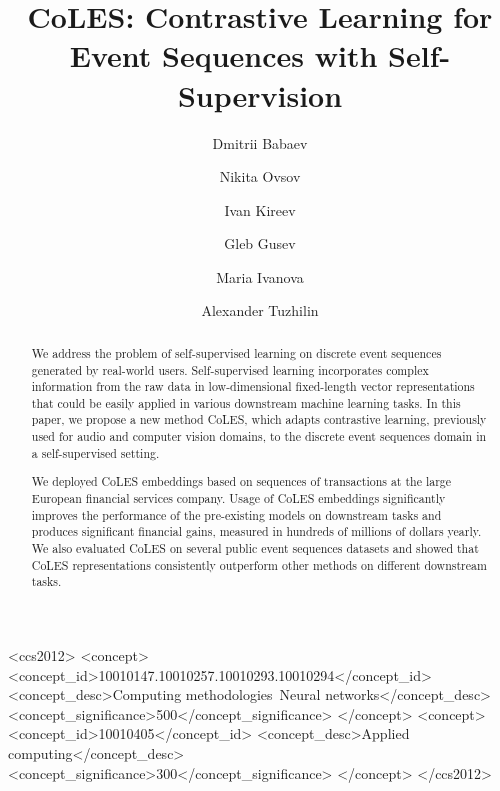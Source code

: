 \documentclass[sigconf]{acmart}
\begin{document}
\title{CoLES: Contrastive Learning for Event Sequences with Self-Supervision}

\author{Dmitrii Babaev} 


\author{Nikita Ovsov} 

\author{Ivan Kireev} 

\author{Gleb Gusev}

\author{Maria Ivanova}

\author{Alexander Tuzhilin}

\begin{abstract}
We address the problem of self-supervised learning on discrete event sequences generated by real-world users. Self-supervised learning incorporates complex information from the raw data in low-dimensional fixed-length vector representations that could be easily applied in various downstream machine learning tasks. In this paper, we propose a new method CoLES, which adapts contrastive learning, previously used for audio and computer vision domains, to the discrete event sequences domain in a self-supervised setting.

We deployed CoLES embeddings based on sequences of transactions at the large European financial services company. Usage of CoLES embeddings significantly improves the performance of the pre-existing models on downstream tasks and produces significant financial gains, measured in hundreds of millions of dollars yearly.
We also evaluated CoLES on several public event sequences datasets and showed that CoLES representations consistently outperform other methods on different downstream tasks.
\end{abstract}

\begin{CCSXML}
<ccs2012>
<concept>
<concept_id>10010147.10010257.10010293.10010294</concept_id>
<concept_desc>Computing methodologies~Neural networks</concept_desc>
<concept_significance>500</concept_significance>
</concept>
<concept>
<concept_id>10010405</concept_id>
<concept_desc>Applied computing</concept_desc>
<concept_significance>300</concept_significance>
</concept>
</ccs2012>
\end{CCSXML}
\end{document}
